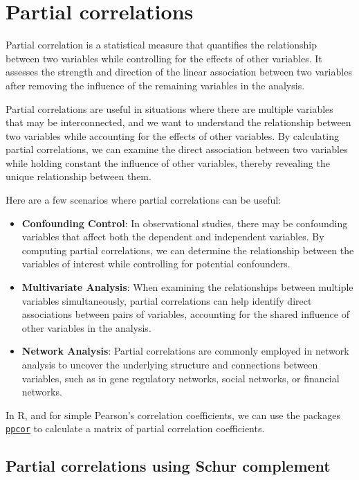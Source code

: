 \documentclass[
]{book}
\begin{document}
\section{Partial correlations}\label{partial-correlations}

Partial correlation is a statistical measure that quantifies the relationship between two variables while controlling for the effects of other variables. It assesses the strength and direction of the linear association between two variables after removing the influence of the remaining variables in the analysis.

Partial correlations are useful in situations where there are multiple variables that may be interconnected, and we want to understand the relationship between two variables while accounting for the effects of other variables. By calculating partial correlations, we can examine the direct association between two variables while holding constant the influence of other variables, thereby revealing the unique relationship between them.

Here are a few scenarios where partial correlations can be useful:

\begin{itemize}
\item
  \textbf{Confounding Control}: In observational studies, there may be confounding variables that affect both the dependent and independent variables. By computing partial correlations, we can determine the relationship between the variables of interest while controlling for potential confounders.
\item
  \textbf{Multivariate Analysis}: When examining the relationships between multiple variables simultaneously, partial correlations can help identify direct associations between pairs of variables, accounting for the shared influence of other variables in the analysis.
\item
  \textbf{Network Analysis}: Partial correlations are commonly employed in network analysis to uncover the underlying structure and connections between variables, such as in gene regulatory networks, social networks, or financial networks.
\end{itemize}

In R, and for simple Pearson's correlation coefficients, we can use the packages \href{https://cran.r-project.org/web/packages/ppcor/index.html}{\texttt{ppcor}} to calculate a matrix of partial correlation coefficients.

\subsection{Partial correlations using Schur complement}\label{partial-correlations-using-schur-complement}
\end{document}

